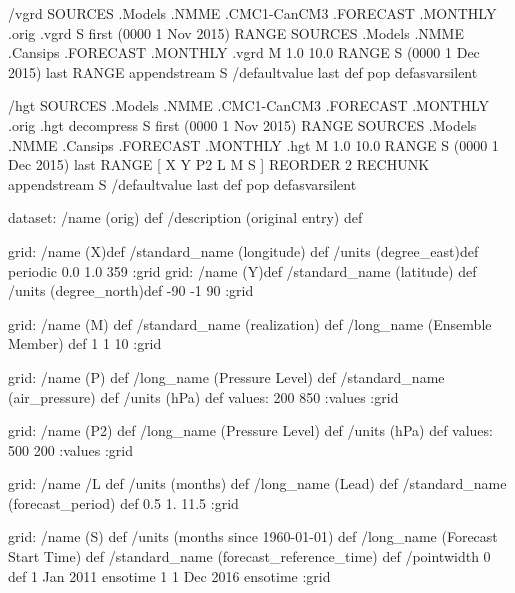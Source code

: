 \begin{ingrid}
/vgrd {
 SOURCES .Models .NMME .CMC1-CanCM3 .FORECAST .MONTHLY .orig .vgrd 
S first (0000 1 Nov 2015) RANGE
 SOURCES .Models .NMME .Cansips .FORECAST .MONTHLY .vgrd
 M 1.0 10.0 RANGE
S (0000 1 Dec 2015) last RANGE
appendstream
S /defaultvalue last def pop
} defasvarsilent

/hgt {
 SOURCES .Models .NMME .CMC1-CanCM3 .FORECAST .MONTHLY .orig .hgt decompress
S first (0000 1 Nov 2015) RANGE
 SOURCES .Models .NMME .Cansips .FORECAST .MONTHLY .hgt 
 M 1.0 10.0 RANGE
S (0000 1 Dec 2015) last RANGE
[ X Y P2 L M S ] REORDER
2 RECHUNK
appendstream
S /defaultvalue last def pop
} defasvarsilent

dataset:
/name (orig) def
/description (original entry) def

grid:
/name (X)def
/standard_name (longitude) def
/units (degree_east)def
periodic
 0.0 1.0 359
:grid
grid:
/name (Y)def
/standard_name (latitude) def
/units (degree_north)def
-90 -1 90
:grid

grid:
/name (M) def
/standard_name (realization) def
/long_name (Ensemble Member) def
1 1 10
:grid

grid:
/name (P) def
/long_name (Pressure Level) def
/standard_name (air_pressure) def
/units (hPa) def
values: 200 850 :values
:grid 

grid:
/name (P2) def
/long_name (Pressure Level) def
/units (hPa) def
values: 500 200 :values
:grid

grid:
/name /L def
/units (months) def
/long_name (Lead) def
/standard_name (forecast_period) def
0.5 1. 11.5
:grid

grid:
/name (S) def
/units (months since 1960-01-01) def
/long_name (Forecast Start Time) def
/standard_name (forecast_reference_time) def
/pointwidth 0 def
1 Jan 2011 ensotime
1
1 Dec 2016 ensotime
:grid


%


\end{ingrid}
